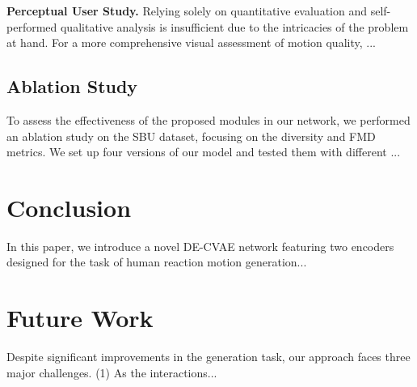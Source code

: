 \noindent
\textbf{Perceptual User Study.} Relying solely on quantitative evaluation and self-performed qualitative analysis is insufficient due to the intricacies of the problem at hand. For a more comprehensive visual assessment of motion quality, ...


\subsection{Ablation Study}
\label{ablation}
To assess the effectiveness of the proposed modules in our network, we performed an ablation study on the SBU dataset, focusing on the diversity and FMD metrics. We set up four versions of our model and tested them with different ... 

\section{Conclusion}
\label{conclusion}
In this paper, we introduce a novel DE-CVAE network featuring two encoders designed for the task of human reaction motion generation... 


\section{Future Work}
\label{future}
Despite significant improvements in the generation task, our approach faces three major challenges. (1) As the interactions...


